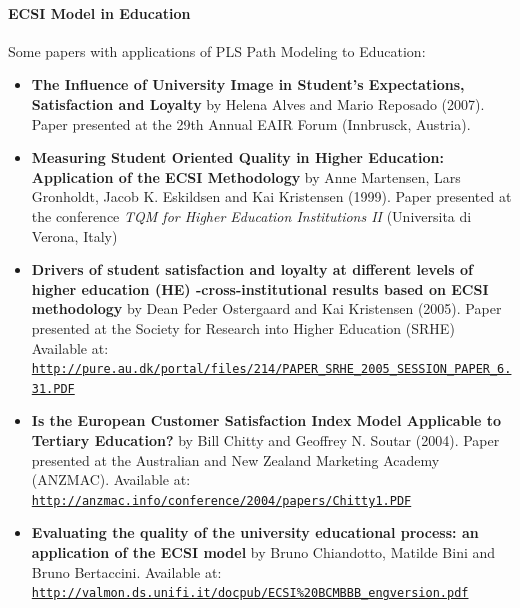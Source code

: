 \documentclass[12pt]{book}\usepackage{graphicx, color}
\begin{document}
\paragraph{ECSI Model in Education} 
Some papers with applications of PLS Path Modeling to Education:
\begin{itemize}
 \vspace{2mm}
 \item \textbf{\textsf{The Influence of University Image in Student's Expectations, Satisfaction and Loyalty}} by Helena Alves and Mario Reposado (2007). Paper presented at the 29th Annual EAIR Forum (Innbrusck, Austria).

 \vspace{2mm}
 \item \textbf{\textsf{Measuring Student Oriented Quality in Higher Education: Application of the ECSI Methodology}} by Anne Martensen, Lars Gronholdt, Jacob K. Eskildsen and Kai Kristensen (1999). Paper presented at the conference \textit{TQM for Higher Education Institutions II} (Universita di Verona, Italy)

 \vspace{2mm}
 \item \textbf{\textsf{Drivers of student satisfaction and loyalty at different levels of higher education (HE) -cross-institutional results based on ECSI methodology}} by Dean Peder Ostergaard and Kai Kristensen (2005). Paper presented at the Society for Research into Higher Education (SRHE) Available at: \\
 \texttt{\href{http://pure.au.dk/portal/files/214/PAPER\_SRHE\_2005\_SESSION\_PAPER\_6.31.PDF}{http://pure.au.dk/portal/files/214/PAPER\_SRHE\_2005\_SESSION\_PAPER\_6.31.PDF}}

 \vspace{2mm}
 \item \textbf{\textsf{Is the European Customer Satisfaction Index Model Applicable to Tertiary Education?}} by Bill Chitty and Geoffrey N. Soutar (2004). Paper presented at the Australian and New Zealand Marketing Academy (ANZMAC). Available at: \\
 \texttt{\href{http://anzmac.info/conference/2004/papers/Chitty1.PDF}{http://anzmac.info/conference/2004/papers/Chitty1.PDF}}

 \vspace{2mm}
 \item \textbf{\textsf{Evaluating the quality of the university educational process: an application of the ECSI model}} by Bruno Chiandotto, Matilde Bini and Bruno Bertaccini. Available at: \\
 \texttt{\href{http://valmon.ds.unifi.it/docpub/ECSI\%20BCMBBB\_engversion.pdf}{http://valmon.ds.unifi.it/docpub/ECSI\%20BCMBBB\_engversion.pdf}}
\end{itemize}
  
\end{document}
